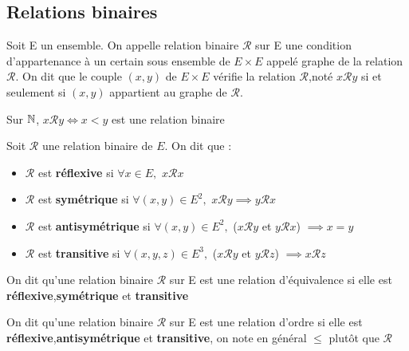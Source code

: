 \subsection{Relations binaires}
\begin{defini}
	Soit E un ensemble. On appelle relation binaire $\mathcal{R}$ sur E une condition d'appartenance à un certain sous ensemble de $E\times E$ appelé graphe de la relation $\mathcal{R}$. On dit que le couple $(x,y)$ de $E\times E$ vérifie la relation $\mathcal{R}$,noté $x\mathcal{R}y$ si et seulement si $(x,y)$ appartient au graphe de $\mathcal{R}$.
\end{defini}
	\begin{ex}
    Sur $\mathbb{N}$, $x\mathcal{R}y\iff x<y$ est une relation binaire
    \end{ex}
	
	\begin{defini}
	Soit $\mathcal{R}$ une relation binaire de $E$. On dit que :
	\begin{itemize}
		\item $\mathcal{R}$ est \textbf{réflexive} si $\forall x\in E,$ $x\mathcal{R}x$
		\item $\mathcal{R}$ est \textbf{symétrique} si $\forall (x,y)\in E^2,$ $x\mathcal{R}y\implies y\mathcal{R}x$
		\item $\mathcal{R}$ est \textbf{antisymétrique} si $\forall (x,y)\in E^2,$ ($x\mathcal{R}y$ et $y\mathcal{R}x$) $\implies x=y$
		\item $\mathcal{R}$ est \textbf{transitive} si $\forall (x,y,z)\in E^3,$ ($x\mathcal{R}y$ et $y\mathcal{R}z$) $\implies x\mathcal{R}z$
	\end{itemize}
\end{defini}
	\begin{defini}
	On dit qu'une relation binaire $\mathcal{R}$ sur E est une relation d'équivalence si elle est \textbf{réflexive},\textbf{symétrique} et \textbf{transitive}\\
    \end{defini}
	\begin{defini}
	On dit qu'une relation binaire $\mathcal{R}$ sur E est une relation d'ordre si elle est \textbf{réflexive},\textbf{antisymétrique} et \textbf{transitive}, on note en général $\leq$ plutôt que $\mathcal{R}$
    \end{defini}